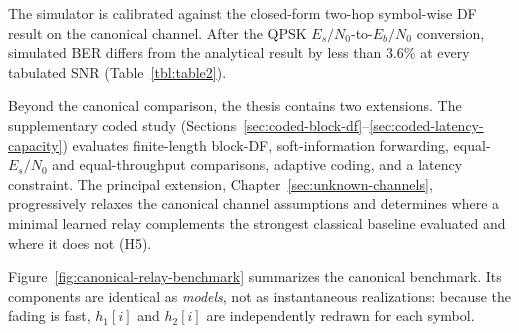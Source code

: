 The simulator is calibrated against the closed-form two-hop symbol-wise DF result on the canonical channel. After the QPSK $E_s/N_0$-to-$E_b/N_0$ conversion, simulated BER differs from the analytical result by less than $3.6\%$ at every tabulated SNR (Table~\ref{tbl:table2}).

Beyond the canonical comparison, the thesis contains two extensions. The supplementary coded study (Sections~\ref{sec:coded-block-df}--\ref{sec:coded-latency-capacity}) evaluates finite-length block-DF, soft-information forwarding, equal-$E_s/N_0$ and equal-throughput comparisons, adaptive coding, and a latency constraint. The principal extension, Chapter~\ref{sec:unknown-channels}, progressively relaxes the canonical channel assumptions and determines where a minimal learned relay complements the strongest classical baseline evaluated and where it does not (H5).

Figure~\ref{fig:canonical-relay-benchmark} summarizes the canonical benchmark. Its components are identical as \emph{models}, not as instantaneous realizations: because the fading is fast, $h_1[i]$ and $h_2[i]$ are independently redrawn for each symbol.

